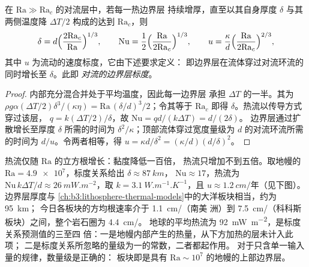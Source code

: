 \begin{theorem}[对流的边界层标度]\label{thm:b3:mantle-convection:scaling}
在 $\mathrm{Ra} \gg \mathrm{Ra}_c$ 的对流层中，若每一热边界层
持续增厚，直至以其自身厚度
$\delta$ 与其两侧温度降 $\Delta T/2$ 构成的达到
$\mathrm{Ra}_c$，则
\[
  \delta = d\Bigl(\frac{2\mathrm{Ra}_c}{\mathrm{Ra}}\Bigr)^{1/3},\qquad
  \mathrm{Nu} = \frac12\Bigl(\frac{\mathrm{Ra}}{2\mathrm{Ra}_c}\Bigr)^{1/3},
  \qquad
  u = \frac\kappa d\Bigl(\frac{\mathrm{Ra}}{2\mathrm{Ra}_c}\Bigr)^{2/3},
\]
其中 $u$ 为流动的速度标度，它由下述要求定义：
即边界层在流体穿过对流环流的同时增长至 $\delta$。此即
\emph{对流的边界层标度}。
\end{theorem}

\begin{proof}
内部充分混合并处于平均温度，因此每一边界层
承担 $\Delta T$ 的一半。其为 $\rho g\alpha(\Delta T/2)
\delta^3/(\kappa\eta) = \mathrm{Ra}\,(\delta/d)^3/2$；令其等于
$\mathrm{Ra}_c$ 即得 $\delta$。热流以传导方式穿过该层，
$q = k(\Delta T/2)/\delta$，故 $\mathrm{Nu} = qd/(k\Delta T) = d/(2\delta)$。
边界层通过扩散增长至厚度 $\delta$ 所需的时间为
$\delta^2/\kappa$；顶部流体穿过宽度量级为
$d$ 的对流环流所需的时间为 $d/u$。令两者相等，得 $u = \kappa d/\delta^2 =
(\kappa/d)(d/\delta)^2$。
\end{proof}

热流仅随 $\mathrm{Ra}$ 的立方根增长：黏度降低一百倍，
热流只增加不到五倍。取地幔的
$\mathrm{Ra} = \num{4.9e7}$，标度关系给出 $\delta \approx \qty{87}{km}$，
$\mathrm{Nu} \approx 17$，热流为 $\mathrm{Nu}\,k\Delta T/d \approx
\qty{26}{mW.m^{-2}}$，取 $k = \qty{3.1}{W.m^{-1}.K^{-1}}$，且 $u \approx
\qty{1.2}{cm/\text{年}}$（见下图）。边界层厚度与
\cref{ch:b3:lithosphere-thermal-models}中的大洋板块相当，约为 \qty{95}{km}；
今日各板块的方均根速率介于 \qty{1.1}{cm/}（南美
洲）到 \qty{7.5}{cm/}（科科斯板块）之间，整个岩石圈为 \qty{4.4}{cm/}。
地球的平均热流为 \qty{92}{mW.m^{-2}}，是标度关系预测值的三至四
倍：一是地幔内部产生的热量，从下方加热的层未计入此项；
二是标度关系所忽略的量级为一的常数，二者都起作用。
对于只含单一输入量的规律，数量级是正确的：
板块即是具有 $\mathrm{Ra}
\sim 10^7$ 的地幔的上部边界层。


